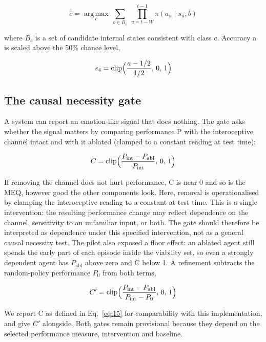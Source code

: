 \documentclass[twoside,11pt]{article}
\begin{document}
\begin{equation}\label{eq:13}
\hat{c}=\operatorname*{arg\,max}_{c}\ \sum_{b\in B_c}\ \prod_{u=t-W}^{t-1}\pi(a_u\mid s_u,b)
\end{equation}

\noindent where $B_{c}$ is a set of candidate internal states consistent with class c. Accuracy a is scaled above the 50\% chance level,

\begin{equation}\label{eq:14}
s_4=\operatorname{clip}\Bigl(\frac{a-1/2}{1/2},\,0,\,1\Bigr)
\end{equation}

\subsection{The causal necessity gate}\label{sec:4.3}

\noindent A system can report an emotion-like signal that does nothing. The gate asks whether the signal matters by comparing performance P with the interoceptive channel intact and with it ablated (clamped to a constant reading at test time):

\begin{equation}\label{eq:15}
C=\operatorname{clip}\Bigl(\frac{P_{\mathrm{int}}-P_{\mathrm{abl}}}{P_{\mathrm{int}}},\,0,\,1\Bigr)
\end{equation}

\noindent If removing the channel does not hurt performance, C is near 0 and so is the MEQ, however good the other components look. Here, removal is operationalised by clamping the interoceptive reading to a constant at test time. This is a single intervention: the resulting performance change may reflect dependence on the channel, sensitivity to an unfamiliar input, or both. The gate should therefore be interpreted as dependence under this specified intervention, not as a general causal necessity test. The pilot also exposed a floor effect: an ablated agent still spends the early part of each episode inside the viability set, so even a strongly dependent agent has $P_{\mathrm{abl}}$ above zero and C below 1. A refinement subtracts the random-policy performance $P_0$ from both terms,

\begin{equation}\label{eq:16}
C'=\operatorname{clip}\Bigl(\frac{P_{\mathrm{int}}-P_{\mathrm{abl}}}{P_{\mathrm{int}}-P_0},\,0,\,1\Bigr)
\end{equation}

\noindent We report C as defined in Eq.~\eqref{eq:15} for comparability with this implementation, and give $C'$ alongside. Both gates remain provisional because they depend on the selected performance measure, intervention and baseline.
\end{document}
